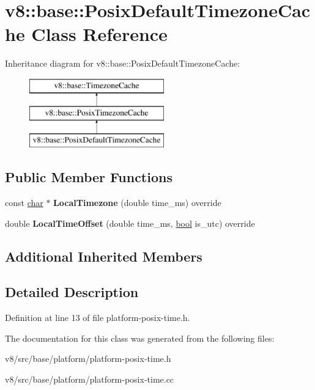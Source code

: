 \hypertarget{classv8_1_1base_1_1PosixDefaultTimezoneCache}{}\section{v8\+:\+:base\+:\+:Posix\+Default\+Timezone\+Cache Class Reference}
\label{classv8_1_1base_1_1PosixDefaultTimezoneCache}
Inheritance diagram for v8\+:\+:base\+:\+:Posix\+Default\+Timezone\+Cache\+:\begin{figure}[H]
\begin{center}
\leavevmode
\includegraphics[height=3.000000cm]{classv8_1_1base_1_1PosixDefaultTimezoneCache}
\end{center}
\end{figure}
\subsection*{Public Member Functions}
\begin{DoxyCompactItemize}
\item 
\mbox{\label{classv8_1_1base_1_1PosixDefaultTimezoneCache_a871cda7beebceab5cdd4be2a19dba774}} 
const \mbox{\hyperlink{classchar}{char}} $\ast$ {\bfseries Local\+Timezone} (double time\+\_\+ms) override
\item 
\mbox{\label{classv8_1_1base_1_1PosixDefaultTimezoneCache_ab9afa7048aab1f4e1e25ae73e6d769d8}} 
double {\bfseries Local\+Time\+Offset} (double time\+\_\+ms, \mbox{\hyperlink{classbool}{bool}} is\+\_\+utc) override
\end{DoxyCompactItemize}
\subsection*{Additional Inherited Members}


\subsection{Detailed Description}


Definition at line 13 of file platform-\/posix-\/time.\+h.



The documentation for this class was generated from the following files\+:\begin{DoxyCompactItemize}
\item 
v8/src/base/platform/platform-\/posix-\/time.\+h\item 
v8/src/base/platform/platform-\/posix-\/time.\+cc\end{DoxyCompactItemize}
